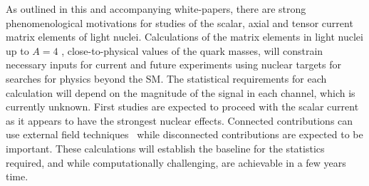 As outlined in this and accompanying white-papers, there are strong phenomenological motivations for studies of the scalar, axial and tensor current matrix elements of light nuclei. Calculations of the matrix elements in light nuclei up to $A=4$ \cite{Winter:2017bfs}, close-to-physical values of the quark masses, will constrain necessary inputs for current and future experiments using nuclear targets for searches for physics beyond the SM. The statistical requirements for each calculation will depend on the magnitude of the signal in each channel, which is currently unknown. First studies are expected to proceed with the scalar current as it appears to have the strongest nuclear effects. Connected contributions can use external field techniques~\cite{Savage:2016kon,Shanahan:2017bgi,Tiburzi:2017iux} while disconnected contributions are expected to be important. These calculations will establish the baseline for the statistics required, and while computationally challenging, are achievable in a few years time.



